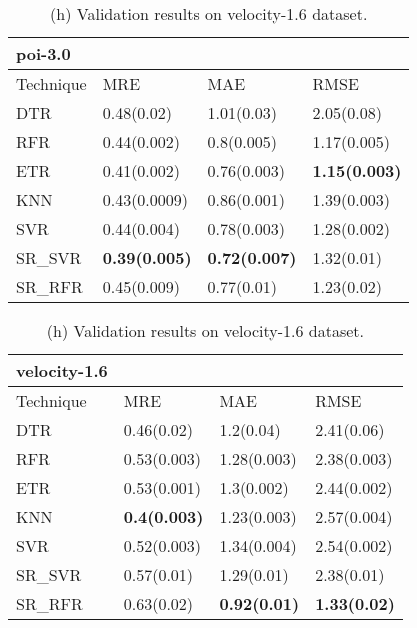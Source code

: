 \documentclass[]{article}
\begin{document}
	\begin{table}[h]
		\captionsetup[subtable]{labelformat=empty}
		\begin{adjustwidth}{-3.4cm}{}
			\begin{subtable}{9.5cm}
				\centering
				\caption{(g) Validation results on poi-3.0 dataset.}
				\label{tab:poi-wv}
				\begin{tabular}{llll}
					\hline
					poi-3.0 &&&\\ \hline
					Technique & MRE & MAE & RMSE\\  \hline
					DTR & 0.48(0.02) & 1.01(0.03) & 2.05(0.08)\\ 
					RFR & 0.44(0.002) & 0.8(0.005) & 1.17(0.005)\\ 
					ETR & 0.41(0.002) & 0.76(0.003) & \bfseries 1.15(0.003)\\ 
					KNN & 0.43(0.0009) & 0.86(0.001) & 1.39(0.003)\\ 
					SVR & 0.44(0.004) & 0.78(0.003) & 1.28(0.002)\\ 
					SR\_SVR & \bfseries 0.39(0.005) & \bfseries 0.72(0.007) & 1.32(0.01)\\
					SR\_RFR & 0.45(0.009) & 0.77(0.01) & 1.23(0.02)\\ \hline
				\end{tabular}
			\end{subtable}
			\begin{subtable}{9cm}
				\centering
				\caption{(h) Validation results on velocity-1.6 dataset.}
				\label{tab:velocity-wv}
				\begin{tabular}{llll}
					\hline
					velocity-1.6 &&&\\ \hline
					Technique & MRE & MAE & RMSE\\  \hline
					DTR & 0.46(0.02) & 1.2(0.04) & 2.41(0.06)\\ 
					RFR & 0.53(0.003) & 1.28(0.003) & 2.38(0.003)\\ 
					ETR & 0.53(0.001) & 1.3(0.002) & 2.44(0.002)\\ 
					KNN & \bfseries 0.4(0.003) & 1.23(0.003) & 2.57(0.004)\\ 
					SVR & 0.52(0.003) & 1.34(0.004) & 2.54(0.002)\\ 
					SR\_SVR & 0.57(0.01) & 1.29(0.01) & 2.38(0.01)\\
					SR\_RFR & 0.63(0.02) & \bfseries 0.92(0.01) & \bfseries 1.33(0.02)\\ \hline
				\end{tabular}
			\end{subtable} 
		\end{adjustwidth}
	\end{table}
\end{document}
